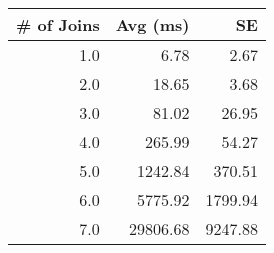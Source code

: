 \begin{tabular}{rrr}
\toprule
 \# of Joins &  Avg (ms) &      SE \\
\midrule
        1.0 &      6.78 &    2.67 \\
        2.0 &     18.65 &    3.68 \\
        3.0 &     81.02 &   26.95 \\
        4.0 &    265.99 &   54.27 \\
        5.0 &   1242.84 &  370.51 \\
        6.0 &   5775.92 & 1799.94 \\
        7.0 &  29806.68 & 9247.88 \\
\bottomrule
\end{tabular}
